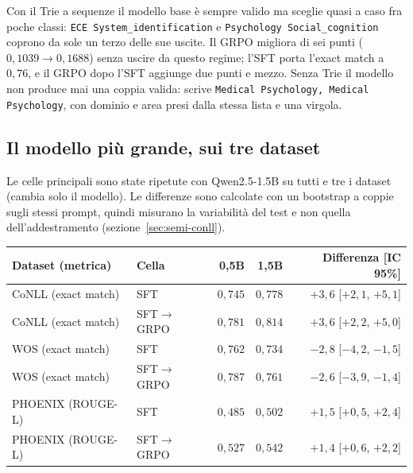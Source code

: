 Con il Trie a sequenze il modello base è sempre valido ma sceglie quasi a caso
fra poche classi: \texttt{ECE System\_identification} e \texttt{Psychology
Social\_cognition} coprono da sole un terzo delle sue uscite. Il GRPO migliora di
sei punti ($0{,}1039 \to 0{,}1688$) senza uscire da questo regime; l'SFT porta
l'exact match a $0{,}76$, e il GRPO dopo l'SFT aggiunge due punti e mezzo.
Senza Trie il modello non produce mai una coppia valida: scrive
\texttt{Medical Psychology, Medical Psychology}, con dominio e area presi
dalla stessa lista e una virgola.

\subsection{Il modello più grande, sui tre dataset}
\label{sec:scala}

Le celle principali sono state ripetute con Qwen2.5-1.5B su tutti e tre i
dataset (cambia solo il modello). Le differenze sono calcolate con un
bootstrap a coppie sugli stessi prompt, quindi misurano la variabilità del test
e non quella dell'addestramento (sezione~\ref{sec:semi-conll}).

\begin{center}
\small
\begin{tabular}{llrrr}
\toprule
Dataset (metrica) & Cella & 0,5B & 1,5B & Differenza [IC 95\%] \\
\midrule
CoNLL (exact match)    & SFT                    & $0{,}745$ & $0{,}778$ & $+3{,}6$ [$+2{,}1$, $+5{,}1$] \\
CoNLL (exact match)    & SFT$\to$GRPO           & $0{,}781$ & $0{,}814$ & $+3{,}6$ [$+2{,}2$, $+5{,}0$] \\
WOS (exact match)      & SFT                    & $0{,}762$ & $0{,}734$ & $-2{,}8$ [$-4{,}2$, $-1{,}5$] \\
WOS (exact match)      & SFT$\to$GRPO           & $0{,}787$ & $0{,}761$ & $-2{,}6$ [$-3{,}9$, $-1{,}4$] \\
PHOENIX (ROUGE-L)      & SFT                    & $0{,}485$ & $0{,}502$ & $+1{,}5$ [$+0{,}5$, $+2{,}4$] \\
PHOENIX (ROUGE-L)      & SFT$\to$GRPO           & $0{,}527$ & $0{,}542$ & $+1{,}4$ [$+0{,}6$, $+2{,}2$] \\
\bottomrule
\end{tabular}
\end{center}

